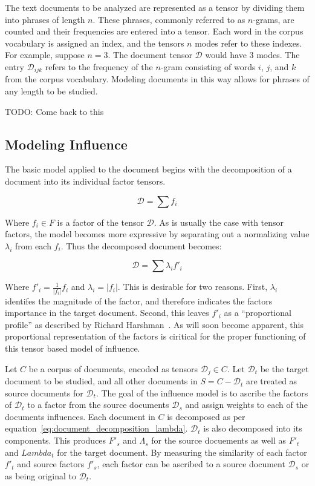 \documentclass[../dissertation.tex]{subfiles}
\begin{document}
The text documents to be analyzed are represented as a tensor by
dividing them into phrases of length $n$.  These phrases, commonly
referred to as $n$-grams, are counted and their frequencies are
entered into a tensor.  Each word in the corpus vocabulary is assigned
an index, and the tensors $n$ modes refer to these indexes.  For
example, suppose $n=3$.  The document tensor $\mathcal{D}$ would have
3 modes.  The entry $\mathcal{D}_{ijk}$ refers to the frequency of the
$n$-gram consisting of words $i$, $j$, and $k$ from the corpus
vocabulary.  Modeling documents in this way allows for phrases of any
length to be studied.

TODO: Come back to this

\subsection{Modeling Influence}
The basic model applied to the document begins with the decomposition
of a document into its individual factor tensors.

\begin{equation} \label{eq:document_decomposition}
  \mathcal{D} = \sum f_i 
\end{equation}

Where $f_i\in F$ is a factor of the tensor $\mathcal{D}$.  As is usually
the case with tensor factors, the model becomes more expressive by
separating out a normalizing value $\lambda_i$ from each $f_i$.  Thus
the decomposed document becomes:

\begin{equation} \label{eq:document_decomposition_normal}
  \mathcal{D} = \sum \lambda_i f'_i
\end{equation}

Where $f'_i=\frac{1}{|f_i|} f_i$ and $\lambda_i = |f_i|$.  This is
desirable for two reasons.  First, $\lambda_i$ identifes the magnitude
of the factor, and therefore indicates the factors importance in the
target document.  Second, this leaves $f'_i$ as a ``proportional
profile'' as described by Richard Harshman~\cite{TODO: Cite  Harshman
  Parafac}. As will soon become apparent, this proportional
representation of the factors is ciritical for the proper functioning
of this tensor based model of influence.

Let $C$ be a corpus of documents, encoded as tensors $\mathcal{D}_j
\in C$.  Let $\mathcal{D}_t$ be the target document to be studied, and
all other documents in $S=C - \mathcal{D}_t$ are treated as source
documents for $\mathcal{D}_t$.  The goal of the influence model is to
ascribe the factors of $\mathcal{D}_t$ to a factor from the source
documents $\mathcal{D}_s$ and assign weights to each of the documents
influences. Each document in $C$ is decomposed as per
equation~\ref{eq:document_decomposition_lambda}.  $\mathcal{D}_t$ is
also decomposed into its components.  This produces $F'_s$ and
$\Lambda_s$ for the source docuements as well as $F'_t$ and $Lambda_t$
for the target document.  By measuring the similarity of each factor
$f'_t$ and source factors $f'_s$, each factor can be ascribed to a
source document $\mathcal{D}_s$ or as being original to
$\mathcal{D}_t$.
\end{document}
